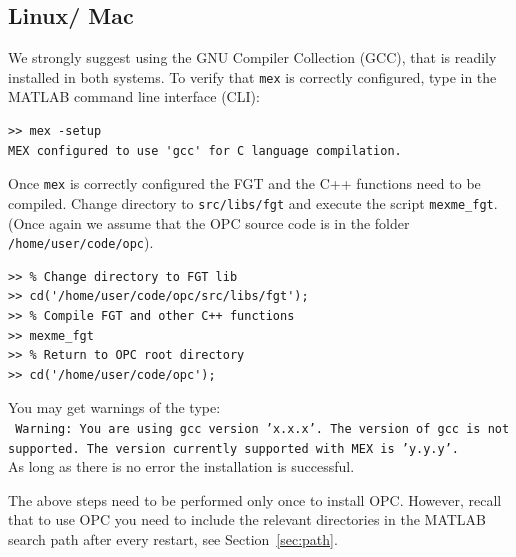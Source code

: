\documentclass{book}
\begin{document}
\subsection{Linux/ Mac}

We strongly suggest using the GNU Compiler Collection (GCC), that is readily
installed in both systems. To verify that {\tt mex} is correctly configured,
type in the MATLAB command line interface (CLI):

\begin{verbatim}
>> mex -setup
MEX configured to use 'gcc' for C language compilation.
\end{verbatim}

%

\noindent
%
Once {\tt mex} is correctly configured the FGT and the C++ functions need to be
compiled. Change directory to {\tt src/libs/fgt} and execute the script {\tt mexme\_fgt}.
(Once again we assume that the OPC source code is in the folder {\tt /home/user/code/opc}).


\begin{verbatim}
>> % Change directory to FGT lib
>> cd('/home/user/code/opc/src/libs/fgt');
>> % Compile FGT and other C++ functions
>> mexme_fgt
>> % Return to OPC root directory
>> cd('/home/user/code/opc');
\end{verbatim}

\noindent
%
You may get warnings of the type:\\
%
{\tt
Warning: You are using gcc version 'x.x.x'. The version of gcc is not supported. The version currently supported with MEX is 'y.y.y'.}\\
%
As long as there is no error the installation is successful.


The above steps need to be performed only once to install OPC. However, recall
that to use OPC you need to include the relevant directories in the MATLAB
search path after every restart, see Section~\ref{sec:path}.

%
\end{document}
